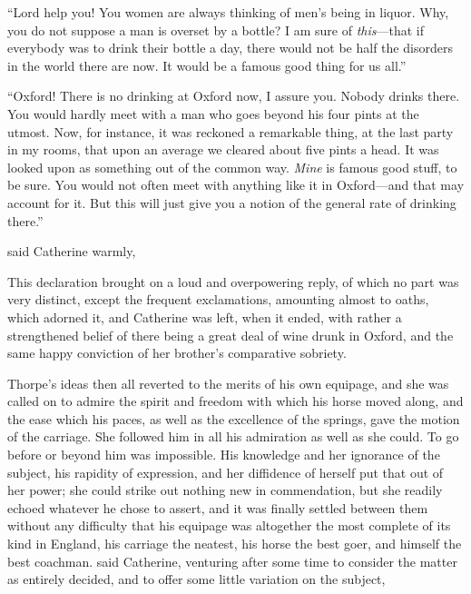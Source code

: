 
“Lord help you! You women are always thinking of men's being in liquor. Why, you do not suppose a man is overset by a bottle? I am sure of {\em this}---that if everybody was to drink their bottle a day, there would not be half the disorders in the world there are now. It would be a famous good thing for us all.”




“Oxford! There is no drinking at Oxford now, I assure you. Nobody drinks there. You would hardly meet with a man who goes beyond his four pints at the utmost. Now, for instance, it was reckoned a remarkable thing, at the last party in my rooms, that upon an average we cleared about five pints a head. It was looked upon as something out of the common way. {\em Mine} is famous good stuff, to be sure. You would not often meet with anything like it in Oxford---and that may account for it. But this will just give you a notion of the general rate of drinking there.”

 said Catherine warmly, 

This declaration brought on a loud and overpowering reply, of which no part was very distinct, except the frequent exclamations, amounting almost to oaths, which adorned it, and Catherine was left, when it ended, with rather a strengthened belief of there being a great deal of wine drunk in Oxford, and the same happy conviction of her brother's comparative sobriety.

Thorpe's ideas then all reverted to the merits of his own equipage, and she was called on to admire the spirit and freedom with which his horse moved along, and the ease which his paces, as well as the excellence of the springs, gave the motion of the carriage. She followed him in all his admiration as well as she could. To go before or beyond him was impossible. His knowledge and her ignorance of the subject, his rapidity of expression, and her diffidence of herself put that out of her power; she could strike out nothing new in commendation, but she readily echoed whatever he chose to assert, and it was finally settled between them without any difficulty that his equipage was altogether the most complete of its kind in England, his carriage the neatest, his horse the best goer, and himself the best coachman.  said Catherine, venturing after some time to consider the matter as entirely decided, and to offer some little variation on the subject, 


